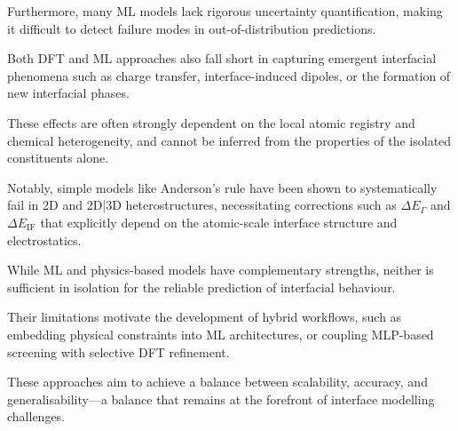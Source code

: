 Furthermore, many ML models lack rigorous uncertainty quantification, making it difficult to detect failure modes in
out-of-distribution predictions.


Both DFT and ML approaches also fall short in capturing emergent interfacial phenomena such as charge transfer,
interface-induced dipoles, or the formation of new interfacial phases.

These effects are often strongly dependent on the local atomic registry and chemical heterogeneity, and cannot be
inferred from the properties of the isolated constituents alone.

Notably, simple models like Anderson's rule have been shown to systematically fail in 2D and 2D|3D heterostructures,
necessitating corrections such as $\Delta E_\Gamma$ and $\Delta E_\mathrm{IF}$ that explicitly depend on the atomic-scale interface
structure and electrostatics.


While ML and physics-based models have complementary strengths, neither is sufficient in isolation for the reliable
prediction of interfacial behaviour.

Their limitations motivate the development of hybrid workflows, such as embedding physical constraints into ML
architectures, or coupling MLP-based screening with selective DFT refinement.

These approaches aim to achieve a balance between scalability, accuracy, and generalisability---a balance that remains at
the forefront of interface modelling challenges.


